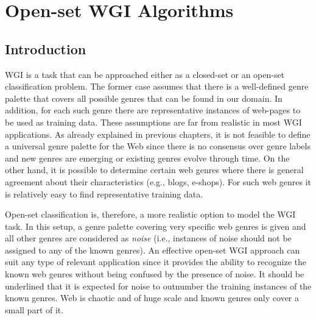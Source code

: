 
\chapter{Open-set WGI Algorithms}

\label{chap:openset}


\newcommand{\keyword}[1]{\textbf{#1}}
\newcommand{\tabhead}[1]{\textbf{#1}}
\newcommand{\code}[1]{\texttt{#1}}
\newcommand{\file}[1]{\texttt{\bfseries#1}}
\newcommand{\option}[1]{\texttt{\itshape#1}}


\section{Introduction}\label{chap:openset:sec:intro}

WGI is a task that can be approached either as a closed-set or an open-set classification problem. The former case assumes that there is a well-defined genre palette that covers all possible genres that can be found in our domain. In addition, for each such genre there are representative instances of web-pages to be used as training data. These assumptions are far from realistic in most WGI applications. As already explained in previous chapters, it is not feasible to define a universal genre palette for the Web since there is no consensus over genre labels and new genres are emerging or existing genres evolve through time. On the other hand, it is possible to determine certain web genres where there is general agreement about their characteristics (e.g., blogs, e-shops). For such web genres it is relatively easy to find representative training data. 

Open-set classification is, therefore, a more realistic option to model the WGI task. In this setup, a genre palette covering very specific web genres is given and all other genres are considered as \textit{noise} (i.e., instances of noise should not be assigned to any of the known genres). An effective open-set WGI approach can suit any type of relevant application since it provides the ability to recognize the known web genres without being confused by the presence of noise. It should be underlined that it is expected for noise to outnumber the training instances of the known genres. Web is chaotic and of huge scale and known genres only cover a small part of it.

